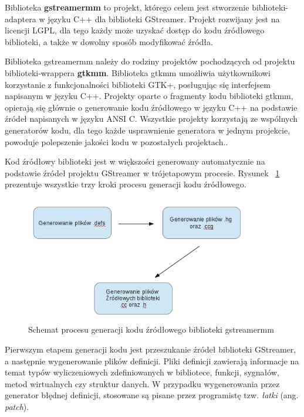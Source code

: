 \documentclass[12pt]{article}
\begin{document}
Biblioteka \textbf{gstreamermm} to projekt, którego celem jest stworzenie biblioteki-adaptera w języku C++ dla biblioteki GStreamer. Projekt rozwijany jest na licencji LGPL, dla tego każdy może uzyskać dostęp do kodu źródłowego biblioteki, a także w dowolny sposób modyfikować źródła.

Biblioteka gstreamermm należy do rodziny projektów pochodzących od projektu biblioteki-wrappera \textbf{gtkmm}. Biblioteka gtkmm umożliwia użytkownikowi korzystanie z funkcjonalności biblioteki GTK+, posługując się interfejsem napisanym w języku C++. Projekty oparte o fragmenty kodu biblioteki gtkmm, opierają się głównie o generowanie kodu źródłowego w języku C++ na podstawie źródeł napisanych w języku ANSI C. Wszystkie projekty korzystają ze wspólnych generatorów kodu, dla tego każde usprawnienie generatora w jednym projekcie, powoduje polepszenie jakości kodu w pozostałych projektach..

Kod źródłowy biblioteki jest w większości generowany automatycznie na podstawie źródeł projektu GStreamer w trójetapowym procesie. Rysunek ~\ref{fig:mmGenerateProcess} prezentuje wszystkie trzy kroki procesu generacji kodu źródłowego.
\begin{figure}[H]
  \includegraphics[width=100mm]{img/mm-generate-process.png}
  \caption{Schemat procesu generacji kodu źródłowego biblioteki gstreamermm}
  \label{fig:mmGenerateProcess}
\end{figure}
Pierwszym etapem generacji kodu jest przeszukanie źródeł biblioteki GStreamer, a następnie wygenerowanie plików definicji. Pliki definicji zawierają informacje na temat typów wyliczeniowych zdefiniowanych w bibliotece, funkcji, sygnałów, metod wirtualnych czy struktur danych. W przypadku wygenerowania przez generator błędnej definicji, stosowane są pisane przez programistę tzw. \textit{łatki} (ang. \textit{patch}).
\end{document}
